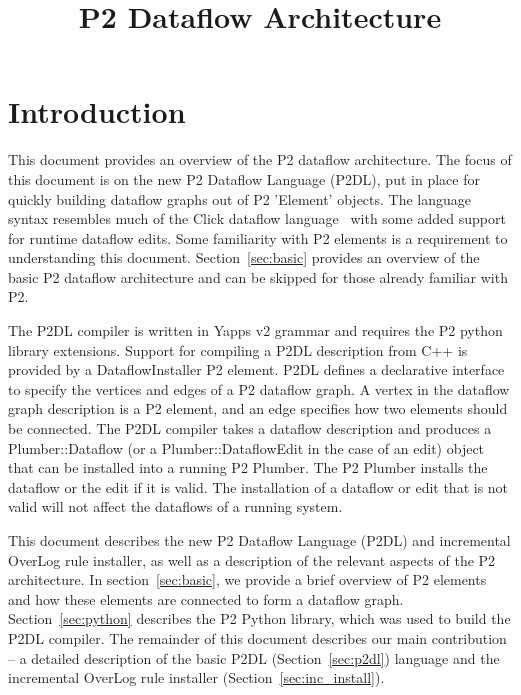 \documentclass[12pt]{article}
\begin{document}
\title{P2 Dataflow Architecture}
\author{}

\date{}
\maketitle
\newcommand{\eat}[1]{}

\section{Introduction}

This document provides an overview of the P2 dataflow architecture.
The focus of this document is on the new P2 Dataflow Language (P2DL), put in place
for quickly building dataflow graphs out of P2 'Element' objects. The language 
syntax resembles much of the Click dataflow language~\cite{click-tocs} with some 
added support for runtime dataflow edits. Some familiarity with P2 elements is a
requirement to understanding this document. Section~\ref{sec:basic} provides
an overview of the basic P2 dataflow architecture and can be skipped for those already
familiar with P2.

The P2DL compiler is written in Yapps v2 grammar and requires the P2 python 
library extensions.  %
Support for compiling a P2DL description from C++ is provided by a DataflowInstaller
P2 element. P2DL defines a declarative interface to specify the vertices and edges 
of a P2 dataflow graph. A vertex in the dataflow graph description is a P2 element, 
and an edge specifies how two elements
should be connected. The P2DL compiler takes a dataflow description and produces
a Plumber::Dataflow (or a Plumber::DataflowEdit in the case of an edit) object that 
can be installed into a running P2 Plumber. The P2 Plumber installs the dataflow 
or the edit if it is valid. The installation of a dataflow or edit that is not valid will not
affect the dataflows of a running system.  

This document describes the new P2 Dataflow Language (P2DL) and incremental OverLog rule installer,
as well as a description of the relevant aspects of the P2 architecture. In section~\ref{sec:basic}, 
we provide a brief overview of P2 elements and how these elements are connected to form a dataflow 
graph. Section~\ref{sec:python} describes the P2 Python library, which was used to build the P2DL 
compiler. The remainder of this document describes our main contribution --
a detailed description of the basic P2DL (Section~\ref{sec:p2dl}) language and the incremental 
OverLog rule installer (Section~\ref{sec:inc_install}).
\end{document}
